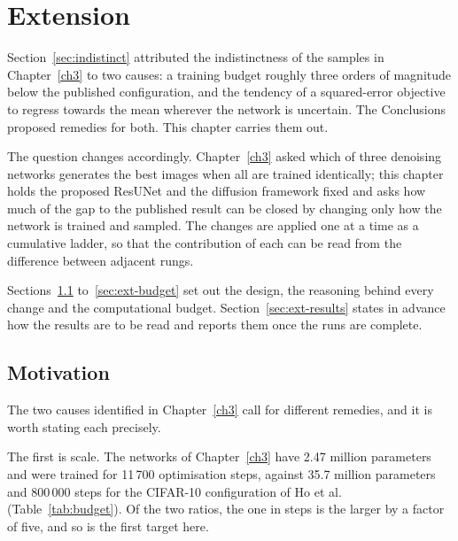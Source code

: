 \chapter{Extension}
\label{ch4}

Section~\ref{sec:indistinct} attributed the indistinctness of the samples in Chapter~\ref{ch3} to
two causes: a training budget roughly three orders of magnitude below the published configuration,
and the tendency of a squared-error objective to regress towards the mean wherever the network is
uncertain. The Conclusions proposed remedies for both. This chapter carries them out.

The question changes accordingly. Chapter~\ref{ch3} asked which of three denoising networks
generates the best images when all are trained identically; this chapter holds the proposed ResUNet
and the diffusion framework fixed and asks how much of the gap to the published result can be closed
by changing only how the network is trained and sampled. The changes are applied one at a time as a
cumulative ladder, so that the contribution of each can be read from the difference between adjacent
rungs.

Sections~\ref{sec:ext-motivation} to~\ref{sec:ext-budget} set out the design, the reasoning behind
every change and the computational budget. Section~\ref{sec:ext-results} states in advance how the
results are to be read and reports them once the runs are complete.

\section{Motivation}
\label{sec:ext-motivation}

The two causes identified in Chapter~\ref{ch3} call for different remedies, and it is worth stating
each precisely.

The first is scale. The networks of Chapter~\ref{ch3} have 2.47 million parameters and were trained
for 11\,700 optimisation steps, against 35.7 million parameters and 800\,000 steps for the CIFAR-10
configuration of Ho et al.\ \parencite{arXiv:2006.11239} (Table~\ref{tab:budget}). Of the two
ratios, the one in steps is the larger by a factor of five, and so is the first target here.

